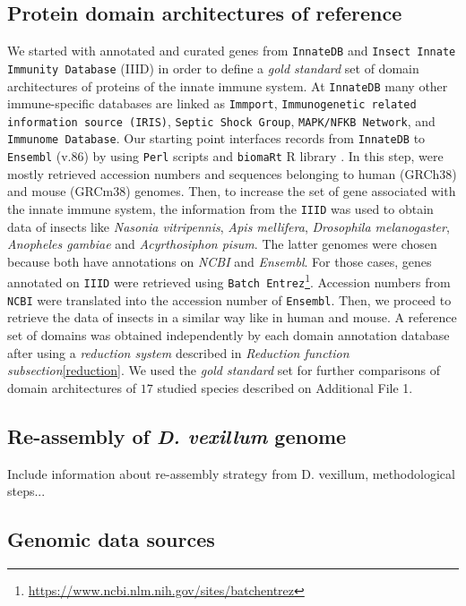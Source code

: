 \documentclass[11pt]{article}
\newcommand{\TODO}[1]{\begingroup\color{red}#1\endgroup}
\begin{document}
\subsection*{Protein domain architectures of reference}
We started with annotated and curated genes from \texttt{InnateDB} 
\cite{Breuer01012013} and \texttt{Insect Innate Immunity Database} (IIID) 
\cite{Brucker2012} in order to define a \textsl{gold standard} set of domain 
architectures of proteins of the innate immune system. At \texttt{InnateDB} many 
other immune-specific databases are linked as \texttt{Immport}, 
\texttt{Immunogenetic related information source (IRIS)}, \texttt{Septic Shock 
Group}, \texttt{MAPK/NFKB Network}, and \texttt{Immunome Database}. Our starting 
point interfaces records from \texttt{InnateDB} to \texttt{Ensembl} (v.86) 
by using \texttt{Perl} scripts and \texttt{biomaRt} R library 
\cite{Durinck:2009aa}. In this step, were mostly retrieved accession numbers 
and sequences belonging to human (GRCh38) and mouse (GRCm38) genomes. Then, to 
increase the set of gene associated with the innate immune system, the 
information from the \texttt{IIID} was used to obtain data of insects like 
\textsl{Nasonia vitripennis}, \textsl{Apis mellifera}, \textsl{Drosophila 
melanogaster}, \textsl{Anopheles gambiae} and \textsl{Acyrthosiphon pisum}. The 
latter genomes were chosen because both have annotations on \textsl{NCBI} and 
\textsl{Ensembl}. For those cases, genes annotated on \texttt{IIID} were 
retrieved using \texttt{Batch Entrez}\footnote{\url{
https://www.ncbi.nlm.nih.gov/sites/batchentrez}}. 
Accession numbers from \texttt{NCBI} were translated into the accession number 
of \texttt{Ensembl}. Then, we proceed to retrieve the data of insects in a 
similar way like in human and mouse. A reference set of domains was obtained 
independently by each domain annotation database after using a \textsl{reduction 
system} described in \textsl{Reduction function subsection}\ref{reduction}. We 
used the \textsl{gold standard} set for further comparisons of domain 
architectures of $17$ studied species described on Additional File 1.

\subsection*{Re-assembly of \textit{D. vexillum} genome}
\TODO{Include information about re-assembly strategy from D. vexillum, 
methodological steps...}

\subsection*{Genomic data sources}
\end{document}
